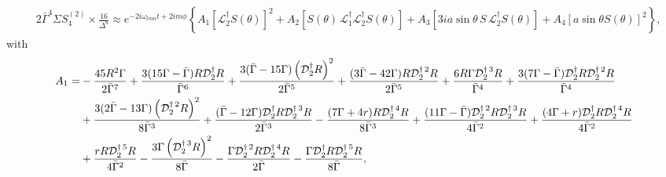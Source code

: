 \documentclass[aps,prd,amsmath,floats,floatfix, twocolumn,
superscriptaddress,nofootinbib,showpacs]{revtex4-1}
\begin{document}
\begin{widetext}
\begin{align}
    &2\bar{\Gamma}^4\Sigma S_4^{(2)} \times\frac{16}{\Delta^6}\approx  e^{-2i\omega_{lmn}t+2im\phi}\left\{ A_1 \left[\mathcal{L}_2^\dagger S(\theta)\right]^2 + A_2 \left[S(\theta)\,\mathcal{L}_1^\dagger\mathcal{L}_2^\dagger S(\theta)\right]+ A_3 \left[3ia\sin\theta\,S \, \mathcal{L}_2^\dagger S(\theta) \right] + A_4 \left[a\sin\theta S(\theta)\right]^2\right\}, \label{eq:final_source_term}
\end{align}
with
\begin{align}
A_1=& -\frac{45 R^2 \Gamma}{2 \bar{\Gamma}^7} + \frac{3(15 \Gamma-\bar{\Gamma}) R \mathcal{D}^{\dagger}_{2}R}{\bar{\Gamma}^6} + \frac{3(\bar{\Gamma}-15\Gamma) \left(\mathcal{D}^{\dagger}_{2}R\right)^2}{2\bar{\Gamma}^5}  + \frac{(3\bar{\Gamma}-42\Gamma) R \mathcal{D}^{\dagger\,2}_{2}R}{2 \bar{\Gamma}^5}  + \frac{6 R \Gamma \mathcal{D}^{\dagger\,3}_{2}R}{\bar{\Gamma}^4} + \frac{3(7 \Gamma-\bar{\Gamma}) \mathcal{D}^{\dagger}_{2}R \mathcal{D}^{\dagger\,2}_{2}R}{\bar{\Gamma}^4}  \notag \\
&+ \frac{3(2\bar{\Gamma}-13\Gamma) \left(\mathcal{D}^{\dagger\,2}_{2}R\right)^2}{8 \bar{\Gamma}^3}  + \frac{(\bar{\Gamma}-12\Gamma)\mathcal{D}^{\dagger}_{2}R \mathcal{D}^{\dagger\,3}_{2}R}{2 \bar{\Gamma}^3} - \frac{(7 \Gamma +4r) R \mathcal{D}^{\dagger\,4}_{2}R}{8 \bar{\Gamma}^3}     + \frac{(11 \Gamma-\bar{\Gamma}) \mathcal{D}^{\dagger\,2}_{2}R \mathcal{D}^{\dagger\,3}_{2}R}{4 \bar{\Gamma}^2}   + \frac{(4 \Gamma+r) \mathcal{D}^{\dagger}_{2}R \mathcal{D}^{\dagger\,4}_{2}R}{4 \bar{\Gamma}^2}\notag \\
&+ \frac{rR \mathcal{D}^{\dagger\,5}_{2}R}{4 \bar{\Gamma}^2}   - \frac{3\Gamma\left( \mathcal{D}^{\dagger\,3}_{2}R\right)^2}{8 \bar{\Gamma}}  - \frac{\Gamma \mathcal{D}^{\dagger\,2}_{2}R \mathcal{D}^{\dagger\,4}_{2}R}{2 \bar{\Gamma}}  - \frac{\Gamma \mathcal{D}^{\dagger}_{2}R \mathcal{D}^{\dagger\,5}_{2}R}{8 \bar{\Gamma}},
\end{align}




\end{widetext}
\end{document}
